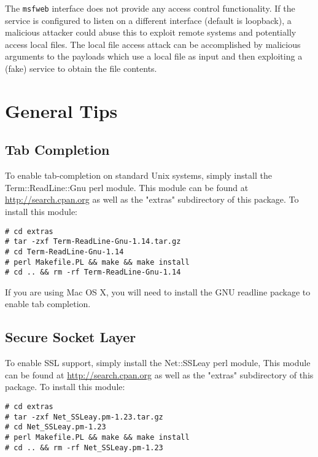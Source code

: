 \documentclass{report}
\begin{document}
\par
The \texttt{msfweb} interface does not provide any access control functionality. If
the service is configured to listen on a different interface (default is
loopback), a malicious attacker could abuse this to exploit remote systems
and potentially access local files. The local file access attack can be
accomplished by malicious arguments to the payloads which use a local file
as input and then exploiting a (fake) service to obtain the file contents.
	

\pagebreak
\chapter{General Tips}


	\section{Tab Completion}
	\label{REF-TAB}
\par
To enable tab-completion on standard Unix systems, simply install the
Term::ReadLine::Gnu perl module. This module can be found at
\url{http://search.cpan.org} as well as the "extras" subdirectory of this
package. To install this module:

\begin{verbatim}
# cd extras
# tar -zxf Term-ReadLine-Gnu-1.14.tar.gz
# cd Term-ReadLine-Gnu-1.14
# perl Makefile.PL && make && make install
# cd .. && rm -rf Term-ReadLine-Gnu-1.14
\end{verbatim}

\par
If you are using Mac OS X, you will need to install the GNU readline package to
enable tab completion. 


	\section{Secure Socket Layer}
	\label{REF-SSL}
\par
To enable SSL support, simply install the Net::SSLeay perl module,
This module can be found at \url{http://search.cpan.org} as well as the
"extras" subdirectory of this package. To install this module:

\begin{verbatim}
# cd extras
# tar -zxf Net_SSLeay.pm-1.23.tar.gz
# cd Net_SSLeay.pm-1.23
# perl Makefile.PL && make && make install
# cd .. && rm -rf Net_SSLeay.pm-1.23
\end{verbatim}
\end{document}
